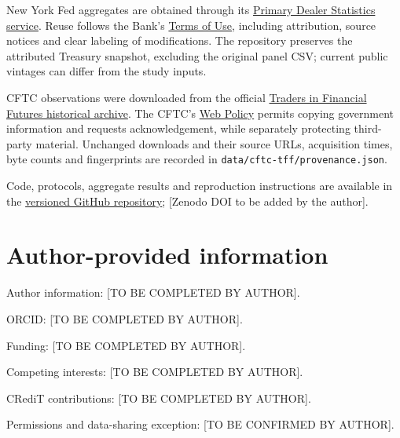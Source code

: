 \documentclass[12pt,a4paper]{article}
\begin{document}
New York Fed aggregates are obtained through its \href{https://www.newyorkfed.org/markets/counterparties/primary-dealers-statistics}{Primary Dealer Statistics service}. Reuse follows the Bank's \href{https://www.newyorkfed.org/privacy/termsofuse.html}{Terms of Use}, including attribution, source notices and clear labeling of modifications. The repository preserves the attributed Treasury snapshot, excluding the original panel CSV; current public vintages can differ from the study inputs.

CFTC observations were downloaded from the official \href{https://www.cftc.gov/MarketReports/CommitmentsofTraders/HistoricalCompressed/index.htm}{Traders in Financial Futures historical archive}. The CFTC's \href{https://www.cftc.gov/sites/default/files/cftc/cftcprivacy.htm}{Web Policy} permits copying government information and requests acknowledgement, while separately protecting third-party material. Unchanged downloads and their source URLs, acquisition times, byte counts and fingerprints are recorded in \texttt{data/cftc-tff/provenance.json}.

Code, protocols, aggregate results and reproduction instructions are available in the \href{https://github.com/ByronLi0207/financial-mathematics-paper-20261020/tree/submission-final}{versioned GitHub repository}; [Zenodo DOI to be added by the author].

\section*{Author-provided information}
Author information: [TO BE COMPLETED BY AUTHOR].\par
ORCID: [TO BE COMPLETED BY AUTHOR].\par
Funding: [TO BE COMPLETED BY AUTHOR].\par
Competing interests: [TO BE COMPLETED BY AUTHOR].\par
CRediT contributions: [TO BE COMPLETED BY AUTHOR].\par
Permissions and data-sharing exception: [TO BE CONFIRMED BY AUTHOR].\par


\FloatBarrier

\clearpage
\end{document}
